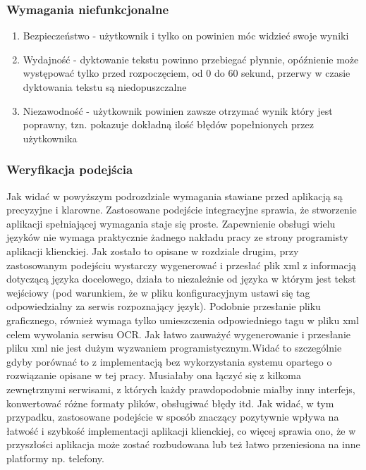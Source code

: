 \subsubsection{Wymagania niefunkcjonalne}
\begin{enumerate}
	\item Bezpieczeństwo - użytkownik i tylko on powinien móc widzieć swoje wyniki
	\item Wydajność - dyktowanie tekstu powinno przebiegać płynnie, opóźnienie może występować tylko przed rozpoczęciem, od 0 do 60 sekund, przerwy w czasie dyktowania tekstu są niedopuszczalne
	\item Niezawodność - użytkownik powinien zawsze otrzymać wynik który jest poprawny, tzn. pokazuje dokładną ilość błędów popełnionych przez użytkownika
\end{enumerate}

\subsubsection{Weryfikacja podejścia}
Jak widać w powyższym podrozdziale wymagania stawiane przed aplikacją są precyzyjne i klarowne. Zastosowane podejście integracyjne sprawia, że stworzenie aplikacji spełniającej wymagania staje się proste. Zapewnienie obsługi wielu języków nie wymaga praktycznie żadnego nakładu pracy ze strony programisty aplikacji klienckiej. Jak zostało to opisane w rozdziale drugim, przy zastosowanym podejściu wystarczy wygenerować i przesłać plik xml z informacją dotyczącą języka docelowego, działa to niezależnie od języka w którym jest tekst wejściowy (pod warunkiem, że w pliku konfiguracyjnym ustawi się tag odpowiedzialny za serwis rozpoznający język). Podobnie przesłanie pliku graficznego, również wymaga tylko umieszczenia odpowiedniego tagu w pliku xml celem wywolania serwisu OCR. Jak łatwo zauważyć wygenerowanie i przesłanie pliku xml nie jest dużym wyzwaniem programistycznym.Widać to szczególnie gdyby porównać to z implementacją bez wykorzystania systemu opartego o rozwiązanie opisane w tej pracy. Musiałaby ona łączyć się z kilkoma zewnętrznymi serwisami, z których każdy prawdopodobnie miałby inny interfejs, konwertować różne formaty plików, obsługiwać błędy itd. Jak widać, w tym przypadku, zastosowane podejście w sposób znaczący pozytywnie wpływa na łatwość i szybkość implementacji aplikacji klienckiej, co więcej sprawia ono, że w przyszłości aplikacja może zostać rozbudowana lub też łatwo przeniesiona na inne platformy np. telefony. \\

